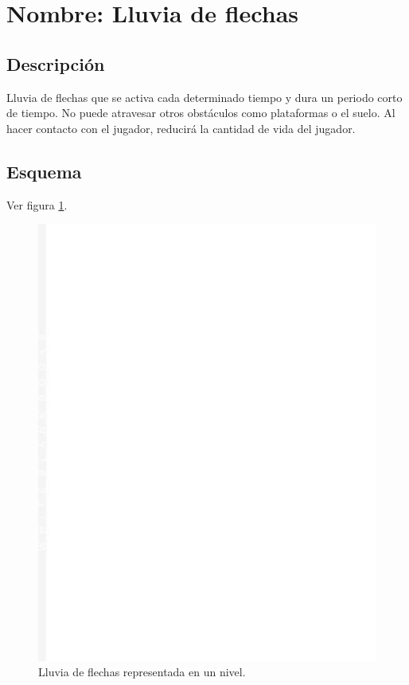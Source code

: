 		\section{Nombre: Lluvia de flechas}\label{obs.lluviaF}
	\subsection{Descripción}
	Lluvia de flechas que se activa cada determinado tiempo y dura un periodo corto de tiempo. No puede atravesar otros obstáculos como plataformas o el suelo. Al hacer contacto con el jugador, reducirá la cantidad de vida del jugador.
	\subsection{Esquema}
	Ver figura \ref{fig:lluviaF}.
	\begin{figure}
		\centering
		\includegraphics[height=0.2 \textheight]{Imagenes/lluviaF}
		\caption{Lluvia de flechas representada en un nivel.}
		\label{fig:lluviaF}
	\end{figure}